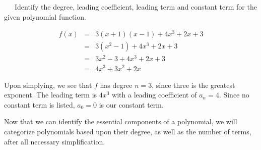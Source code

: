 \newpage

\begin{example}~~~Identify the degree, leading coefficient, leading term and constant term for the given polynomial function.

\begin{eqnarray*}
f(x) &=& 3(x+1)(x-1)+4x^3+2x+3\\
& = & 3(x^2-1)+4x^3+2x+3\\
& = & 3x^2-3+4x^3+2x+3\\
& = & 4x^3+3x^2+2x
\end{eqnarray*}

Upon simplying, we see that $f$ has degree $n=3$, since three is the greatest exponent.\pp
The leading term is $4x^3$ with a leading coefficient of $a_n=4$.\pp
Since no constant term is listed, $a_0=0$ is our constant term.
\end{example}

Now that we can identify the essential components of a polynomial, we will categorize polynomials based upon their degree, as well as the number of terms, after all necessary simplification.

